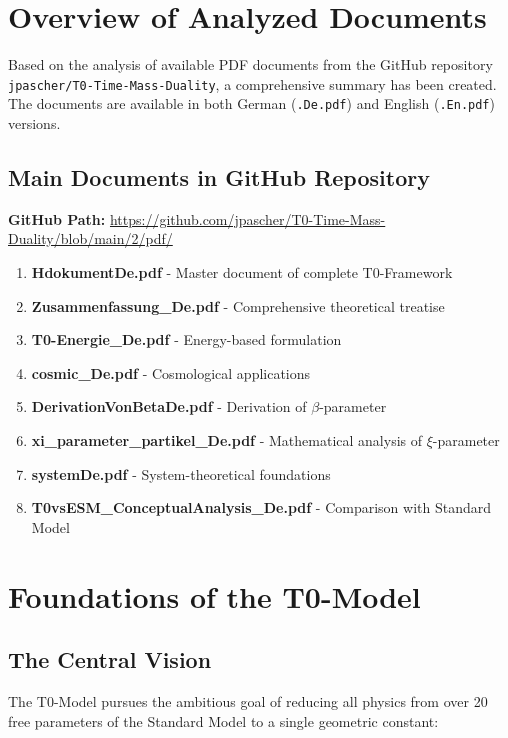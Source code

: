 \documentclass[12pt,a4paper]{article}
\newcommand{\xipar}{\xi}
\newcommand{\betapar}{\beta}
\begin{document}
	\section{Overview of Analyzed Documents}
	
	Based on the analysis of available PDF documents from the GitHub repository \texttt{jpascher/T0-Time-Mass-Duality}, a comprehensive summary has been created. The documents are available in both German (\texttt{.De.pdf}) and English (\texttt{.En.pdf}) versions.
	
	\subsection{Main Documents in GitHub Repository}
	
	\textbf{GitHub Path:} \url{https://github.com/jpascher/T0-Time-Mass-Duality/blob/main/2/pdf/}
	
	\begin{enumerate}
		\item \textbf{HdokumentDe.pdf} - Master document of complete T0-Framework
		\item \textbf{Zusammenfassung\_De.pdf} - Comprehensive theoretical treatise
		\item \textbf{T0-Energie\_De.pdf} - Energy-based formulation
		\item \textbf{cosmic\_De.pdf} - Cosmological applications
		\item \textbf{DerivationVonBetaDe.pdf} - Derivation of $\betapar$-parameter
		\item \textbf{xi\_parameter\_partikel\_De.pdf} - Mathematical analysis of $\xipar$-parameter
		\item \textbf{systemDe.pdf} - System-theoretical foundations
		\item \textbf{T0vsESM\_ConceptualAnalysis\_De.pdf} - Comparison with Standard Model
	\end{enumerate}
	
	\section{Foundations of the T0-Model}
	
	\subsection{The Central Vision}
	
	The T0-Model pursues the ambitious goal of reducing all physics from over 20 free parameters of the Standard Model to a single geometric constant:
	
\end{document}
